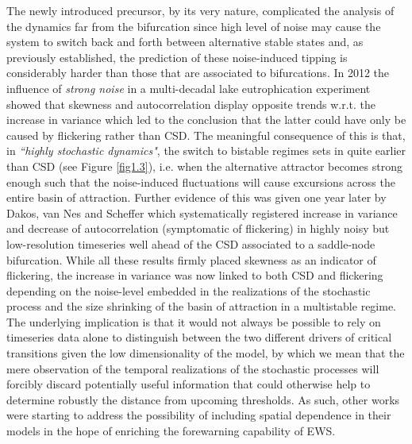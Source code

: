 \documentclass[../main.tex]{subfiles}
\begin{document}
The newly introduced precursor, by its very nature, complicated the analysis of the dynamics far from the bifurcation since high level of noise may cause the system to switch back and forth between alternative stable states and, as previously established, the prediction of these noise-induced tipping is considerably harder than those that are associated to bifurcations. 
In 2012 the influence of \textit{strong noise} in a multi-decadal lake eutrophication experiment showed that skewness and autocorrelation display opposite trends w.r.t. the increase in variance \cite{Wang12} which led to the conclusion that the latter could have only be caused by flickering rather than CSD.
The meaningful consequence of this is that, in \textit{``highly stochastic dynamics"}, the switch to bistable regimes sets in quite earlier than CSD (see Figure \ref{fig1.3}), i.e. when the alternative attractor becomes strong enough such that the noise-induced fluctuations will cause excursions across the entire basin of attraction.
Further evidence of this was given one year later by Dakos, van Nes and Scheffer \cite{Dakos13} which systematically registered increase in variance and decrease of autocorrelation (symptomatic of flickering) in highly noisy but low-resolution timeseries well ahead of the CSD associated to a saddle-node bifurcation.
While all these results firmly placed skewness as an indicator of flickering, the increase in variance was now linked to both CSD and flickering depending on the noise-level embedded in the realizations of the stochastic process and the size shrinking of the basin of attraction in a multistable regime.
The underlying implication is that it would not always be possible to rely on timeseries data alone to distinguish between the two different drivers of critical transitions given the low dimensionality of the model, by which we mean that the mere observation of the temporal realizations of the stochastic processes will forcibly discard potentially useful information that could otherwise help to determine robustly the distance from upcoming thresholds.
As such, other works were starting to address the possibility of including spatial dependence in their models in the hope of enriching the forewarning capability of EWS.
\end{document}

